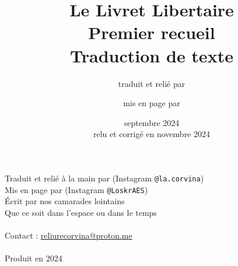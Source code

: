 \usepackage[placement=center,angle=45,color=black!35,scale=4]{background}


\title{Le Livret Libertaire\\[2em]\large Premier recueil\\[2em]\large Traduction de texte}
\author{\normalsize traduit et relié par  \and \normalsize mis en page par }
\date{septembre 2024\\relu et corrigé en novembre 2024}



 
\fontsize{12}{15}\selectfont

\afterpage{\blankpage[-4]}
\afterpage{\blankpage}
\afterpage{\blankpage}
\afterpage{\blankpage}

\frontmatter
\maketitle

\begin{flushleft}
	\vspace*{\fill}
	\small

	Traduit et relié à la main par  (Instagram \texttt{@la.corvina})\\
	Mis en page par  (Instagram \texttt{@LoskrAES})\\
	Écrit par nos camarades lointains\\
	Que ce soit dans l’espace ou dans le temps\\
	~\\
	Contact : \href{mailto:reliurecorvina@proton.me}{reliurecorvina@proton.me}\\
	~\\
	Produit en 2024
\end{flushleft}





